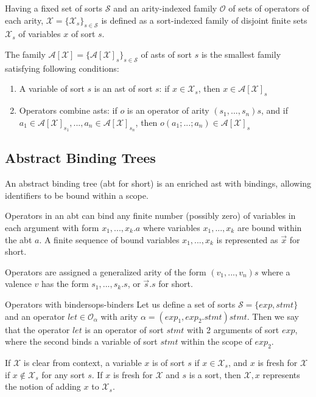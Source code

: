 Having a fixed set of sorts $\mathcal{S}$ and an arity-indexed family $\mathcal{O}$ of sets of operators of each arity, $\mathcal{X} = \{ \mathcal{X}_s \}_{s \in \mathcal{S}}$ is defined as a sort-indexed family of disjoint finite sets $\mathcal{X}_s$ of variables $x$ of sort $s$.

The family $\mathcal{A}[\mathcal{X}] = \{ \mathcal{A}[\mathcal{X}]_s \}_{s \in \mathcal{S}}$ of asts of sort $s$ is the smallest family satisfying following conditions:

\begin{enumerate}
    \item A variable of sort $s$ is an ast of sort $s$: if $x \in \mathcal{X}_s$, then $x \in \mathcal{A}[ \mathcal{X}]_s$
    \item Operators combine asts: if $o$ is an operator of arity $(s_1,...,s_n)s$, and if $a_1 \in \mathcal{A}[\mathcal{X}]_{s_1},...,a_n \in \mathcal{A}[\mathcal{X}]_{s_n}$, then $o(a_1;...;a_n) \in \mathcal{A}[\mathcal{X}]_s$
\end{enumerate}

\subsection{Abstract Binding Trees}
An abstract binding tree (abt for short) is an enriched ast with bindings, allowing identifiers to be bound within a scope.

Operators in an abt can bind any finite number (possibly zero) of variables in each argument with form $x_1,...,x_k.a$ where variables $x_1,...,x_k$ are bound within the abt $a$. A finite sequence of bound variables $x_1,...,x_k$ is represented as $\vec{x}$ for short.

Operators are assigned a generalized arity of the form $(v_1,...,v_n)s$ where a valence $v$ has the form $s_1,...,s_k.s$, or $\Vec{s}.s$ for short.

\begin{example}{Operators with binders}{ops-binders}
    Let us define a set of sorts $\mathcal{S} = \{ exp, stmt \}$ and an operator $let \in \mathcal{O}_\alpha$ with arity $\alpha = (exp_1,exp_2.stmt)stmt$. Then we say that the operator $let$ is an operator of sort $stmt$ with 2 arguments of sort $exp$, where the second binds a variable of sort $stmt$ within the scope of $exp_2$.
\end{example}

If $\mathcal{X}$ is clear from context, a variable $x$ is of sort $s$ if $x \in \mathcal{X}_s$, and $x$ is fresh for $\mathcal{X}$ if $x \notin \mathcal{X}_s$ for any sort $s$. If $x$ is fresh for $\mathcal{X}$ and $s$ is a sort, then $\mathcal{X},x$ represents the notion of adding $x$ to $\mathcal{X}_s$.

